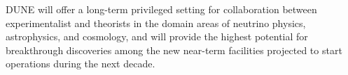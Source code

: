 DUNE will offer a long-term privileged setting for collaboration between experimentalist and theorists in the domain areas of neutrino physics, astrophysics, and cosmology, and will provide the highest potential for breakthrough discoveries among the new near-term facilities projected to start operations during the next decade.




